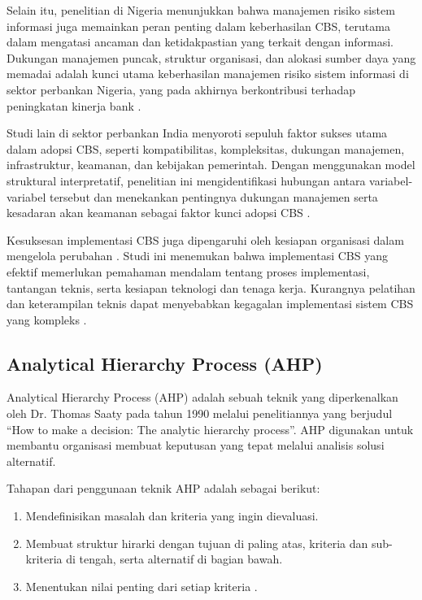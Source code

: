 \documentclass[journal,article,submit,pdftex,moreauthors]{Definitions/mdpi}
\begin{document}
Selain itu, penelitian di Nigeria menunjukkan bahwa manajemen risiko sistem informasi juga memainkan peran penting dalam keberhasilan CBS, terutama dalam mengatasi ancaman dan ketidakpastian yang terkait dengan informasi. Dukungan manajemen puncak, struktur organisasi, dan alokasi sumber daya yang memadai adalah kunci utama keberhasilan manajemen risiko sistem informasi di sektor perbankan Nigeria, yang pada akhirnya berkontribusi terhadap peningkatan kinerja bank \cite{falisat-csf}.

Studi lain \cite{salu-csf} di sektor perbankan India menyoroti sepuluh faktor sukses utama dalam adopsi CBS, seperti kompatibilitas, kompleksitas, dukungan manajemen, infrastruktur, keamanan, dan kebijakan pemerintah. Dengan menggunakan model struktural interpretatif, penelitian ini mengidentifikasi hubungan antara variabel-variabel tersebut dan menekankan pentingnya dukungan manajemen serta kesadaran akan keamanan sebagai faktor kunci adopsi CBS \cite{salu-csf}.

Kesuksesan implementasi CBS juga dipengaruhi oleh kesiapan organisasi dalam mengelola perubahan \cite{johny-csf}. Studi ini menemukan bahwa implementasi CBS yang efektif memerlukan pemahaman mendalam tentang proses implementasi, tantangan teknis, serta kesiapan teknologi dan tenaga kerja. Kurangnya pelatihan dan keterampilan teknis dapat menyebabkan kegagalan implementasi sistem CBS yang kompleks \cite{johny-csf}.

\subsection{Analytical Hierarchy Process (AHP)}
Analytical Hierarchy Process (AHP) adalah sebuah teknik yang diperkenalkan oleh Dr. Thomas Saaty pada tahun 1990 melalui penelitiannya yang berjudul “How to make a decision: The analytic hierarchy process”. AHP digunakan untuk membantu organisasi membuat keputusan yang tepat melalui analisis solusi alternatif. 

Tahapan dari penggunaan teknik AHP adalah sebagai berikut:
\begin{enumerate}
    \item Mendefinisikan masalah dan kriteria yang ingin dievaluasi.
    \item Membuat struktur hirarki dengan tujuan di paling atas, kriteria dan sub-kriteria di tengah, serta alternatif di bagian bawah.
    \item Menentukan nilai penting dari setiap kriteria \cite{Jacob2021}.
\end{enumerate}
\end{document}
